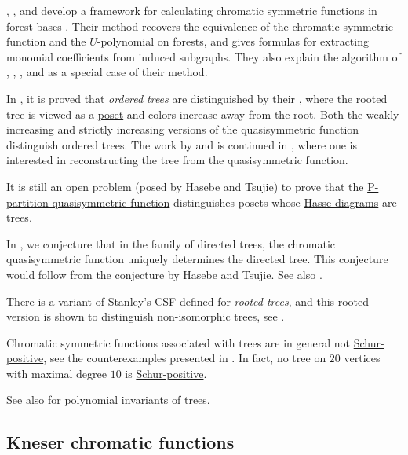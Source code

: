 , , and
 develop a framework for calculating chromatic
symmetric functions in forest bases \cite{MobarakiGerivaniNezhad2024x}.
Their method recovers the equivalence of the chromatic symmetric function and
the $U$-polynomial on forests, and gives formulas for extracting monomial
coefficients from induced subgraphs.  They also explain the algorithm of
, , ,
and  as a special case of their method.

In \cite[Thm.~1.3]{HasebeTsujie2017}, it is proved that \emph{ordered trees}
are distinguished by their
\label{orderQuasisymmetricFunction},
where the rooted tree is viewed as a \hyperref[posets]{poset} and colors
increase away from the root.
Both the weakly increasing and strictly increasing versions of the
quasisymmetric function distinguish ordered trees.
The work by  and  is continued in \cite{Zhou2020x},
where one is interested in reconstructing the tree from the quasisymmetric function.

It is still an open problem (posed by Hasebe and Tsujie) to prove that
the \hyperref[pPartition]{P-partition quasisymmetric function} distinguishes
posets whose \hyperref[hasseDiagram]{Hasse diagrams} are trees.

In \cite{AlexanderssonSulzgruber2019}, we conjecture that in the family of directed trees,
the chromatic quasisymmetric function uniquely determines the directed tree.
This conjecture would follow from the conjecture by Hasebe and Tsujie.
See also \cite{FoleyKazdanKrollAlbergaMelnykTenenbaum2021x}.


There is a variant of Stanley's CSF defined for \emph{rooted trees},
and this rooted version is shown to distinguish non-isomorphic trees, see
\cite{LoehrWarrington2024}.


Chromatic symmetric functions associated with trees are in general not
\hyperref[schurPositiveDefinition]{Schur-positive},
see the counterexamples presented in \cite{EmmanuellaSandratraRambeloson2020}.
In fact, no tree on $20$ vertices with maximal degree $10$ is
\hyperref[schurPositiveDefinition]{Schur-positive}.


See also \cite{PrietoMartinWagnerZamora2024x} for polynomial invariants of
trees.

\subsection[chromaticTreeVariants]{Kneser chromatic functions}

